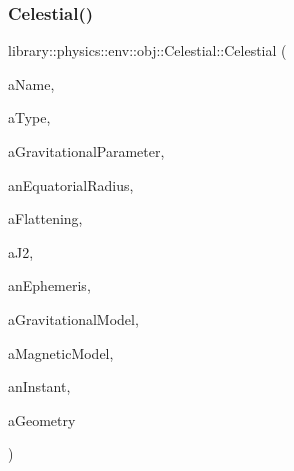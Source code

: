 \subsubsection{\texorpdfstring{Celestial()}{Celestial()}\hspace{0.1cm}{\footnotesize\ttfamily [2/2]}}
{\footnotesize\ttfamily library\+::physics\+::env\+::obj\+::\+Celestial\+::\+Celestial (\begin{DoxyParamCaption}\item[{const String \&}]{a\+Name,  }\item[{const \hyperlink{classlibrary_1_1physics_1_1env_1_1obj_1_1_celestial_aab1f58aa727e639288d65f3d33c4f245}{Celestial\+::\+Type} \&}]{a\+Type,  }\item[{const \hyperlink{classlibrary_1_1physics_1_1units_1_1_derived}{Derived} \&}]{a\+Gravitational\+Parameter,  }\item[{const \hyperlink{classlibrary_1_1physics_1_1units_1_1_length}{Length} \&}]{an\+Equatorial\+Radius,  }\item[{const Real \&}]{a\+Flattening,  }\item[{const Real \&}]{a\+J2,  }\item[{const Shared$<$ \hyperlink{classlibrary_1_1physics_1_1env_1_1_ephemeris}{Ephemeris} $>$ \&}]{an\+Ephemeris,  }\item[{const Shared$<$ \hyperlink{namespacelibrary_1_1physics_1_1env_1_1obj_ade509c84a4970a3420c03c058ada152a}{Gravitational\+Model} $>$ \&}]{a\+Gravitational\+Model,  }\item[{const Shared$<$ \hyperlink{namespacelibrary_1_1physics_1_1env_1_1obj_a86d4e595a77f8bd5ed03ecd32c3a80de}{Magnetic\+Model} $>$ \&}]{a\+Magnetic\+Model,  }\item[{const \hyperlink{classlibrary_1_1physics_1_1time_1_1_instant}{Instant} \&}]{an\+Instant,  }\item[{const \hyperlink{classlibrary_1_1physics_1_1env_1_1_object_abdf50733c7ad97327fb64edca5670f13}{Object\+::\+Geometry} \&}]{a\+Geometry }\end{DoxyParamCaption})}

\mbox{\label{classlibrary_1_1physics_1_1env_1_1obj_1_1_celestial_a508a59c34ac23a582f2fed6003c4c907}} 
